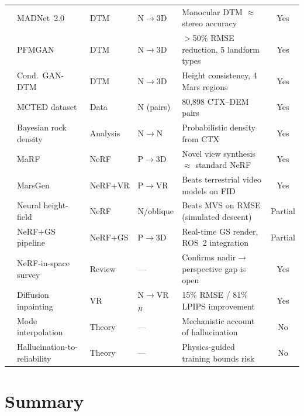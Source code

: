 \begin{table}[H]
{\begin{tabular}{@{}lllllc@{}}
\cite{tao2021madnet}    & MADNet~2.0          & DTM     & N$\to$3D  & Monocular DTM $\approx$ stereo accuracy                    & Yes \\
\cite{zou2026pfmgan}    & PFMGAN              & DTM     & N$\to$3D  & $>$50\% RMSE reduction, 5 landform types                   & Yes \\
\cite{cao2024gen3d}     & Cond.\ GAN-DTM      & DTM     & N$\to$3D  & Height consistency, 4 Mars regions                         & Yes \\
\cite{osadnik2025mcted} & MCTED dataset       & Data    & N (pairs) & 80,898 CTX--DEM pairs                                      & Yes \\
\cite{serrano2013hirise}& Bayesian rock density & Analysis & N$\to$N & Probabilistic density from CTX                             & Yes \\
\cite{giusti2022marf}   & MaRF                & NeRF    & P$\to$3D  & Novel view synthesis $\approx$ standard NeRF               & Yes \\
\cite{li2025martian}    & MarsGen             & NeRF+VR & P$\to$VR  & Beats terrestrial video models on FID                      & Yes \\
\cite{dealmeida2025neural3d} & Neural height-field & NeRF & N/oblique & Beats MVS on RMSE (simulated descent)                    & Partial \\
\cite{martinezpetersen2025hifi} & NeRF+GS pipeline & NeRF+GS & P$\to$3D & Real-time GS render, ROS~2 integration                   & Partial \\
\cite{paul2025nerfspace}& NeRF-in-space survey & Review  & ---       & Confirms nadir$\to$perspective gap is open                & Yes \\
\cite{catalano2025inpainting} & Diffusion inpainting & VR & N$\to$VR$_H$ & 15\% RMSE / 81\% LPIPS improvement                     & Yes \\
\cite{aithal2024hallucination} & Mode interpolation & Theory & --- & Mechanistic account of hallucination                    & No \\
\cite{rathkopf2025reliability} & Hallucination-to-reliability & Theory & --- & Physics-guided training bounds risk                & No \\
\bottomrule
\end{tabular}}
\end{table}

\section{Summary}

